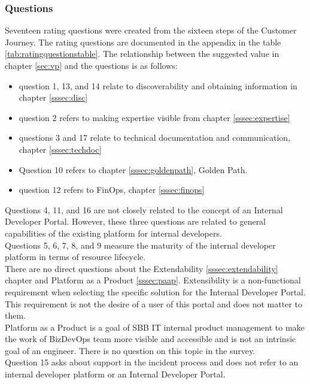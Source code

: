 \documentclass[a4paper,12pt]{article}
\begin{document}
    \subsubsection{Questions}
    \label{sssec:questions}
    Seventeen rating questions were created from the sixteen steps of the Customer Journey.
    The rating questions are documented in the appendix in the table \ref{tab:ratingquestionstable}.
    The relationship between the suggested value in chapter \ref{sec:vp} and the questions is as follows:
    \begin{itemize}
        \item question 1, 13, and 14 relate to discoverability and obtaining information in chapter \ref{sssec:disc}
        \item question 2 refers to making expertise visible from chapter \ref{sssec:expertise}
        \item questions 3 and 17 relate to technical documentation and communication, chapter \ref{sssec:techdoc}
        \item Question 10 refers to chapter \ref{sssec:goldenpath}, Golden Path.
        \item question 12 refers to FinOps, chapter \ref{sssec:finops}
    \end{itemize}
    Questions 4, 11, and 16 are not closely related to the concept of an Internal Developer Portal.
    However, these three questions are related to general capabilities of the existing platform for internal developers.\\
    Questions 5, 6, 7, 8, and 9 measure the maturity of the internal developer platform in terms of resource lifecycle.\\
    There are no direct questions about the Extendability \ref{sssec:extendability} chapter and Platform as a Product
    \ref{sssec:paap}.
    Extensibility is a non-functional requirement when selecting the specific solution for the Internal Developer Portal.
    This requirement is not the desire of a user of this portal and does not matter to them.\\
    Platform as a Product is a goal of SBB IT internal product management to make the work of BizDevOps
    team more visible and accessible and is not an intrinsic goal of an engineer.
    There is no question on this topic in the survey.\\
    Question 15 asks about support in the incident process and does not refer to an internal developer platform or an
    Internal Developer Portal. \\
\end{document}
